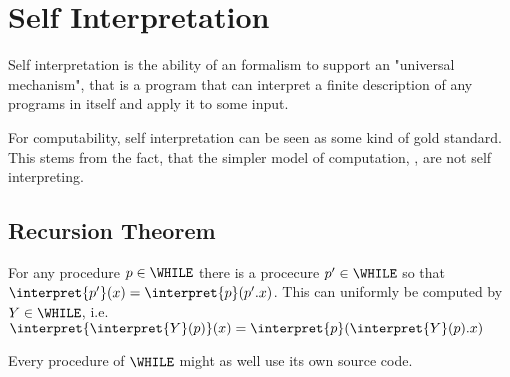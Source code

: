 \section{Self Interpretation}
\label{sec:self}
Self interpretation is the ability of an formalism to support an
"universal mechanism", that is a program that can interpret a finite
description of any programs in itself and apply it to some input.

For computability, self interpretation can be seen as some kind of gold
standard\citationneeded. This stems from the fact, that the simpler model of
computation, \FOR, are not self interpreting.

\subsection{Recursion Theorem}
\begin{theorem}
	For any procedure $p\in \WHILE$ there is a procecure $p'\in \WHILE$ so 
	that $\interpret{p'}(x) = \interpret{p}(p'.x)$. This can uniformly be 
	computed by $Y\in \WHILE$, i.e. $\interpret{\interpret{Y}(p)}(x) = \interpret{p}(\interpret{Y}(p).x)$

	Every procedure of $\WHILE$ might as well use its own source code.
\end{theorem}
